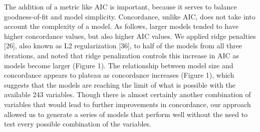 \documentclass[12pt,oneside]{reedthesis}
\theoremstyle{definition}
\theoremstyle{definition}
\theoremstyle{definition}
\theoremstyle{remark}
\begin{document}
The addition of a metric like AIC is important, because it serves to
balance goodness-of-fit and model simplicity. Concordance, unlike AIC,
does not take into account the complexity of a model. As follows, larger
models tended to have higher concordance values, but also higher AIC
values. We applied ridge penalties {[}26{]}, also known as L2
regularization {[}36{]}, to half of the models from all three
iterations, and noted that ridge penalization controls this increase in
AIC as models become larger (Figure 1). The relationship between model
size and concordance appears to plateau as concordance increases (Figure
1), which suggests that the models are reaching the limit of what is
possible with the available 243 variables. Though there is almost
certainly another combination of variables that would lead to further
improvements in concordance, our approach allowed us to generate a
series of models that perform well without the need to test every
possible combination of the variables.
\end{document}
